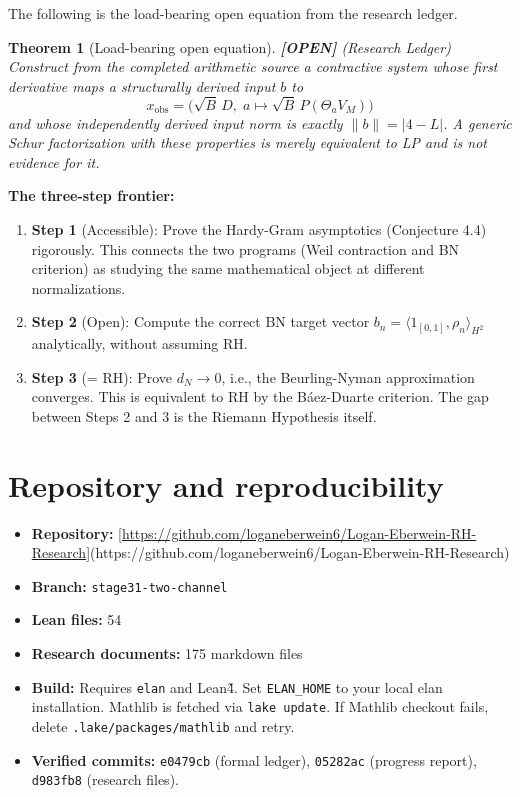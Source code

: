 \documentclass[11pt]{article}
\newtheorem{theorem}{Theorem}[section]
\theoremstyle{remark}
\newcommand{\OPEN}{\textbf{\color{purple}[OPEN]}}
\begin{document}
The following is the load-bearing open equation from the research ledger.

\begin{theorem}[Load-bearing open equation] \OPEN{} (Research Ledger)
Construct from the completed arithmetic source a contractive system
whose first derivative maps a structurally derived input $b$ to
\[
x_{\mathrm{obs}} = \bigl(\sqrt{B}\,D,\; a \mapsto \sqrt{B}\,P(\Theta_a V_M)\bigr)
\]
and whose independently derived input norm is exactly $\|b\| = |4 - L|$.
A generic Schur factorization with these properties is merely equivalent to LP
and is not evidence for it.
\end{theorem}

\textbf{The three-step frontier:}

\begin{enumerate}
\item \textbf{Step 1} (Accessible): Prove the Hardy-Gram asymptotics (Conjecture 4.4) rigorously.
This connects the two programs (Weil contraction and BN criterion) as studying
the same mathematical object at different normalizations.

\item \textbf{Step 2} (Open): Compute the correct BN target vector $b_n = \langle 1_{[0,1]}, \rho_n\rangle_{H^2}$
analytically, without assuming RH.

\item \textbf{Step 3} (= RH): Prove $d_N \to 0$, i.e., the Beurling-Nyman approximation converges.
This is equivalent to RH by the Báez-Duarte criterion.
The gap between Steps 2 and 3 is the Riemann Hypothesis itself.
\end{enumerate}

\section{Repository and reproducibility}

\begin{itemize}
\item \textbf{Repository:} \url{[https://github.com/loganeberwein6/Logan-Eberwein-RH-Research}](https://github.com/loganeberwein6/Logan-Eberwein-RH-Research)
\item \textbf{Branch:} \texttt{stage31-two-channel}
\item \textbf{Lean files:} 54
\item \textbf{Research documents:} 175 markdown files
\item \textbf{Build:} Requires \texttt{elan} and Lean\~4. Set \texttt{ELAN\_HOME} to
your local elan installation. Mathlib is fetched via \texttt{lake update}.
If Mathlib checkout fails, delete \texttt{.lake/packages/mathlib} and retry.
\item \textbf{Verified commits:} \texttt{e0479cb} (formal ledger),
\texttt{05282ac} (progress report), \texttt{d983fb8} (research files).
\end{itemize}
\end{document}
